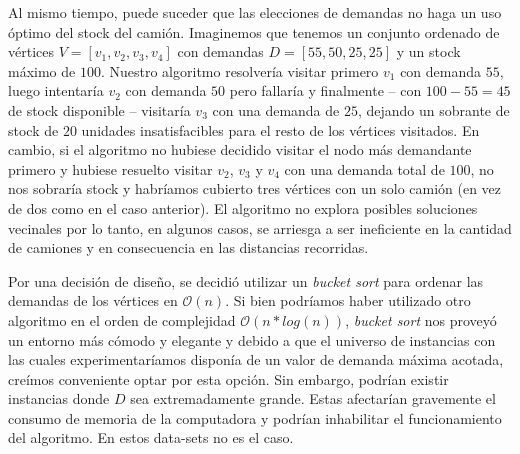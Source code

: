 Al mismo tiempo, puede suceder que las elecciones de demandas no haga un uso óptimo del stock del camión. Imaginemos que tenemos un conjunto ordenado de vértices $V=[v_{1}, v_{2}, v_{3}, v_{4}]$ con demandas $D=[55, 50, 25, 25]$ y un stock máximo de $100$. Nuestro algoritmo resolvería visitar primero $v_{1}$ con demanda $55$, luego intentaría $v_{2}$ con demanda $50$ pero fallaría y finalmente – con $100 - 55 = 45$ de stock disponible – visitaría $v_{3}$ con una demanda de $25$, dejando un sobrante de stock de $20$ unidades insatisfacibles para el resto de los vértices visitados. En cambio, si el algoritmo no hubiese decidido visitar el nodo más demandante primero y hubiese resuelto visitar $v_{2}$, $v_{3}$ y $v_{4}$ con una demanda total de $100$, no nos sobraría stock y habríamos cubierto tres vértices con un solo camión (en vez de dos como en el caso anterior). El algoritmo no explora posibles soluciones vecinales por lo tanto, en algunos casos, se arriesga a ser ineficiente en la cantidad de camiones y en consecuencia en las distancias recorridas.

Por una decisión de diseño, se decidió utilizar un \textit{bucket sort} para ordenar las demandas de los vértices en $\mathcal{O}(n)$. Si bien podríamos haber utilizado otro algoritmo en el orden de complejidad $\mathcal{O}(n*log(n))$, \textit{bucket sort} nos proveyó un entorno más cómodo y elegante y debido a que el universo de instancias con las cuales experimentaríamos disponía de un valor de demanda máxima acotada, creímos conveniente optar por esta opción. Sin embargo, podrían existir instancias donde $D$ sea extremadamente grande. Estas afectarían gravemente el consumo de memoria de la computadora y podrían inhabilitar el funcionamiento del algoritmo. En estos data-sets no es el caso.

